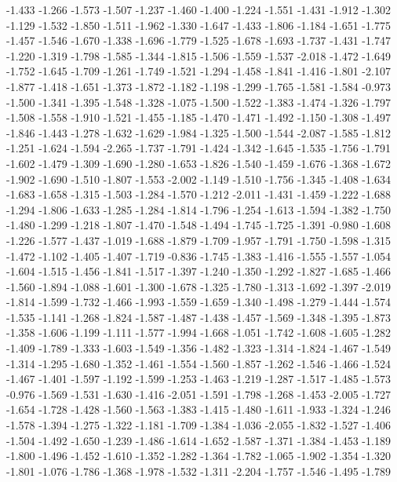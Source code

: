 \documentclass[9pt]{article}
\theoremstyle{plain}
\theoremstyle{definition}
\theoremstyle{remark}
\numberwithin{equation}{section}
\begin{document}
-1.433
-1.266
-1.573
-1.507
-1.237
-1.460
-1.400
-1.224
-1.551
-1.431
-1.912
-1.302
-1.129
-1.532
-1.850
-1.511
-1.962
-1.330
-1.647
-1.433
-1.806
-1.184
-1.651
-1.775
-1.457
-1.546
-1.670
-1.338
-1.696
-1.779
-1.525
-1.678
-1.693
-1.737
-1.431
-1.747
-1.220
-1.319
-1.798
-1.585
-1.344
-1.815
-1.506
-1.559
-1.537
-2.018
-1.472
-1.649
-1.752
-1.645
-1.709
-1.261
-1.749
-1.521
-1.294
-1.458
-1.841
-1.416
-1.801
-2.107
-1.877
-1.418
-1.651
-1.373
-1.872
-1.182
-1.198
-1.299
-1.765
-1.581
-1.584
-0.973
-1.500
-1.341
-1.395
-1.548
-1.328
-1.075
-1.500
-1.522
-1.383
-1.474
-1.326
-1.797
-1.508
-1.558
-1.910
-1.521
-1.455
-1.185
-1.470
-1.471
-1.492
-1.150
-1.308
-1.497
-1.846
-1.443
-1.278
-1.632
-1.629
-1.984
-1.325
-1.500
-1.544
-2.087
-1.585
-1.812
-1.251
-1.624
-1.594
-2.265
-1.737
-1.791
-1.424
-1.342
-1.645
-1.535
-1.756
-1.791
-1.602
-1.479
-1.309
-1.690
-1.280
-1.653
-1.826
-1.540
-1.459
-1.676
-1.368
-1.672
-1.902
-1.690
-1.510
-1.807
-1.553
-2.002
-1.149
-1.510
-1.756
-1.345
-1.408
-1.634
-1.683
-1.658
-1.315
-1.503
-1.284
-1.570
-1.212
-2.011
-1.431
-1.459
-1.222
-1.688
-1.294
-1.806
-1.633
-1.285
-1.284
-1.814
-1.796
-1.254
-1.613
-1.594
-1.382
-1.750
-1.480
-1.299
-1.218
-1.807
-1.470
-1.548
-1.494
-1.745
-1.725
-1.391
-0.980
-1.608
-1.226
-1.577
-1.437
-1.019
-1.688
-1.879
-1.709
-1.957
-1.791
-1.750
-1.598
-1.315
-1.472
-1.102
-1.405
-1.407
-1.719
-0.836
-1.745
-1.383
-1.416
-1.555
-1.557
-1.054
-1.604
-1.515
-1.456
-1.841
-1.517
-1.397
-1.240
-1.350
-1.292
-1.827
-1.685
-1.466
-1.560
-1.894
-1.088
-1.601
-1.300
-1.678
-1.325
-1.780
-1.313
-1.692
-1.397
-2.019
-1.814
-1.599
-1.732
-1.466
-1.993
-1.559
-1.659
-1.340
-1.498
-1.279
-1.444
-1.574
-1.535
-1.141
-1.268
-1.824
-1.587
-1.487
-1.438
-1.457
-1.569
-1.348
-1.395
-1.873
-1.358
-1.606
-1.199
-1.111
-1.577
-1.994
-1.668
-1.051
-1.742
-1.608
-1.605
-1.282
-1.409
-1.789
-1.333
-1.603
-1.549
-1.356
-1.482
-1.323
-1.314
-1.824
-1.467
-1.549
-1.314
-1.295
-1.680
-1.352
-1.461
-1.554
-1.560
-1.857
-1.262
-1.546
-1.466
-1.524
-1.467
-1.401
-1.597
-1.192
-1.599
-1.253
-1.463
-1.219
-1.287
-1.517
-1.485
-1.573
-0.976
-1.569
-1.531
-1.630
-1.416
-2.051
-1.591
-1.798
-1.268
-1.453
-2.005
-1.727
-1.654
-1.728
-1.428
-1.560
-1.563
-1.383
-1.415
-1.480
-1.611
-1.933
-1.324
-1.246
-1.578
-1.394
-1.275
-1.322
-1.181
-1.709
-1.384
-1.036
-2.055
-1.832
-1.527
-1.406
-1.504
-1.492
-1.650
-1.239
-1.486
-1.614
-1.652
-1.587
-1.371
-1.384
-1.453
-1.189
-1.800
-1.496
-1.452
-1.610
-1.352
-1.282
-1.364
-1.782
-1.065
-1.902
-1.354
-1.320
-1.801
-1.076
-1.786
-1.368
-1.978
-1.532
-1.311
-2.204
-1.757
-1.546
-1.495
-1.789
\end{document}

